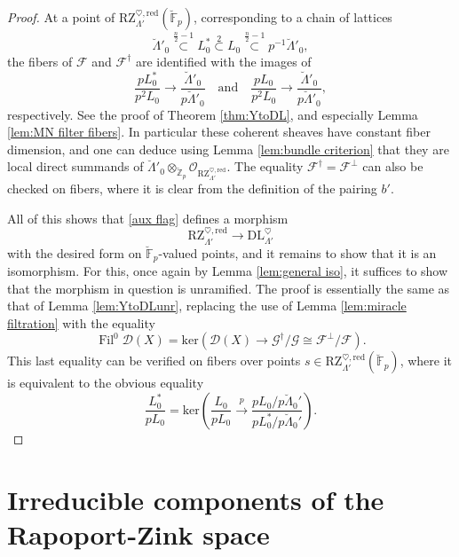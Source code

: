 \documentclass[11pt]{alggeom}
\newcommand{\map}[1]{\xrightarrow{#1}}
\newcommand{\iso}{\cong}
\newcommand{\red}{\mathrm{red}}
\newcommand{\Z}{\mathbb Z}
\newcommand{\F}{\mathbb F}
\newcommand{\co}{\mathcal O}
\DeclareMathOperator{\Fil}{Fil}
\begin{document}
\begin{proof}
At a point of $\mathrm{RZ}_{\Lambda'}^{\heartsuit,\red} (\breve{\F}_p)$, corresponding to a chain of lattices
\[
  \breve{\Lambda}'_0   \stackrel{\frac{n}{2}-1} { \subset } L_0^* \stackrel{2}{\subset}  L_0  \stackrel{\frac{n}{2}-1} { \subset }p^{-1} \breve{\Lambda}'_0   , 
  \]
  the fibers of $\mathscr{F}$ and $\mathscr{F}^\dagger$ are identified with the images of
\[
\frac{pL_0^*}{p^2L_0} \to  \frac{ \breve{\Lambda}'_0  }{   p \breve{\Lambda}'_0  } 
\quad\mbox{and}\quad
\frac{pL_0}{p^2 L_0}  \to  \frac{ \breve{\Lambda}'_0  }{   p \breve{\Lambda}'_0  } ,
\]
respectively. 
See the  proof of Theorem \ref{thm:YtoDL}, and especially Lemma \ref{lem:MN filter fibers}. 
In particular these coherent sheaves have constant fiber dimension, and one can deduce using Lemma \ref{lem:bundle criterion} that they are local direct summands of $\breve{\Lambda}' _0
 \otimes_{ \breve{\Z}_p} \co_{\mathrm{RZ}_{\Lambda'}^{\heartsuit,\red} }$.
 The equality $\mathscr{F}^\dagger = \mathscr{F}^\perp$ can also be checked on fibers, where it is clear from the definition of the pairing $b'$.
 
 All of this shows that \eqref{aux flag} defines a morphism 
 \[
 \mathrm{RZ}_{\Lambda'}^{\heartsuit,\red} \to \mathrm{DL}_{\Lambda'}^\heartsuit
 \]
  with the desired form on $\breve{\F}_p$-valued points, and it remains to show that it is an isomorphism.
  For this, once again by Lemma \ref{lem:general iso}, it suffices to show that the  morphism in question is  unramified.
  The proof is essentially the same as that of Lemma \ref{lem:YtoDLunr}, replacing the use of Lemma \ref{lem:miracle filtration} with the equality
 \[
 \Fil^0 \mathscr{D}(X) = \mathrm{ker} ( \mathscr{D}(X) \to \mathscr{G}^\dagger/\mathscr{G} \iso \mathscr{F}^\perp/\mathscr{F}).
 \]
This last equality can be verified on  fibers over points $s\in  \mathrm{RZ}_{\Lambda'}^{\heartsuit,\red}(\breve{\F}_p)$, where it is equivalent to the obvious equality
\[
\frac{L^*_0}{p L_0} 
 = \mathrm{ker}\left(
\frac{L_0}{pL_0} \map{p} \frac{pL_0 / p \breve{\Lambda}_0'}{pL_0^* / p \breve{\Lambda}_0'} 
\right) . 
\]
\end{proof}










\section{Irreducible components of the Rapoport-Zink space}
\end{document}
